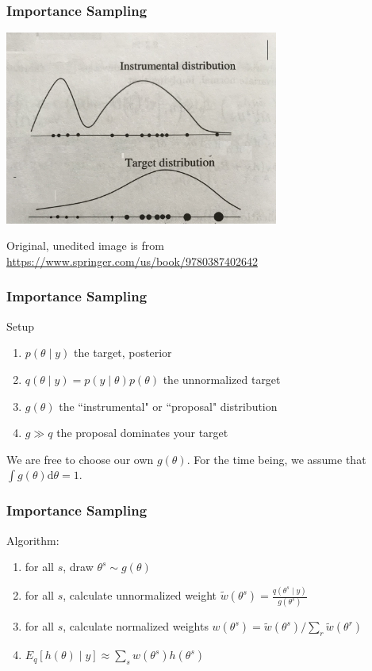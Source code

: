 \documentclass{beamer}
\begin{document}
\begin{frame}[fragile]
\frametitle{Importance Sampling}

\begin{center}
\includegraphics[width=90mm]{is.jpg}
\end{center}
Original, unedited image is from \url{https://www.springer.com/us/book/9780387402642}

\end{frame}
\begin{frame}[fragile]
\frametitle{Importance Sampling}

Setup
\begin{enumerate}
\item $p(\theta \mid y)$ the target, posterior
\item $q(\theta \mid y) = p(y \mid \theta) p(\theta)$ the unnormalized target
\item $g(\theta)$ the ``instrumental" or ``proposal" distribution
\item $g \gg q$ the proposal dominates your target 
\end{enumerate}
We are free to choose our own $g(\theta)$. For the time being, we assume that $\int g(\theta) \text{d}\theta = 1$.


\end{frame}


\begin{frame}[fragile]
\frametitle{Importance Sampling}

Algorithm:
\begin{enumerate}
\item for all $s$, draw $\theta^s \sim g(\theta)$
\item for all $s$, calculate unnormalized weight $\tilde{w}(\theta^s) = \frac{q(\theta^s \mid y)}{g(\theta^s)}$
\item for all $s$, calculate normalized weights $w(\theta^s) = \tilde{w}(\theta^s)/\sum_r \tilde{w}(\theta^r)$
\item $E_q[h(\theta) \mid y] \approx \sum_s w(\theta^s) h(\theta^s)$
\end{enumerate}

\end{frame}
\end{document}
